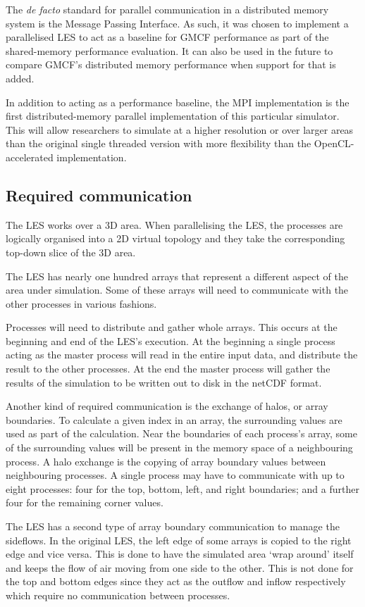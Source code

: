 The \textit{de facto} standard for parallel communication in a distributed
memory system is the Message Passing Interface. As such, it was chosen to
implement a parallelised LES to act as a baseline for GMCF performance as part
of the shared-memory performance evaluation. It can also be used in the future
to compare GMCF's distributed memory performance when support for that is added.

In addition to acting as a performance baseline, the MPI implementation is the
first distributed-memory parallel implementation of this particular simulator.
This will allow researchers to simulate at a higher resolution or over larger
areas than the original single threaded version with more flexibility than the
OpenCL-accelerated implementation.

\subsection{Required communication}

The LES works over a 3D area. When parallelising the LES, the processes are
logically organised into a 2D virtual topology and they take the corresponding
top-down slice of the 3D area.

The LES has nearly one hundred arrays that represent a different aspect of the
area under simulation. Some of these arrays will need to communicate with the
other processes in various fashions.

Processes will need to distribute and gather whole arrays. This occurs at the
beginning and end of the LES's execution. At the beginning a single process
acting as the master process will read in the entire input data, and distribute
the result to the other processes. At the end the master process will gather the
results of the simulation to be written out to disk in the netCDF format.

Another kind of required communication is the exchange of halos, or array
boundaries. To calculate a given index in an array, the surrounding values are
used as part of the calculation. Near the boundaries of each process's array,
some of the surrounding values will be present in the memory space of a
neighbouring process. A halo exchange is the copying of array boundary values
between neighbouring processes. A single process may have to communicate with up
to eight processes: four for the top, bottom, left, and right boundaries; and a
further four for the remaining corner values.

The LES has a second type of array boundary communication to manage the
sideflows. In the original LES, the left edge of some arrays is copied to the
right edge and vice versa. This is done to have the simulated area `wrap around'
itself and keeps the flow of air moving from one side to the other. This is not
done for the top and bottom edges since they act as the outflow and inflow
respectively which require no communication between processes.

